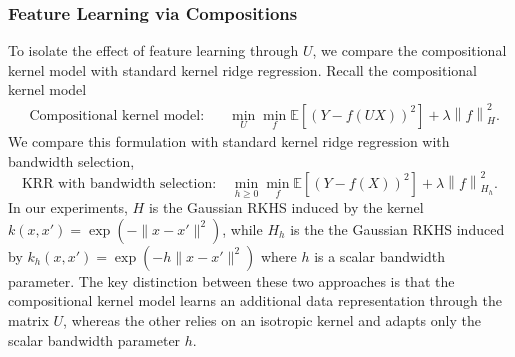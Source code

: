 \documentclass[sn-mathphys-num]{sn-jnl}%
\numberwithin{equation}{section}
\newcommand{\E}{\mathbb{E}}
\newcommand{\norm}[1]{\left\|{#1}\right\|} %
\theoremstyle{thmstyleone}%
\theoremstyle{thmstyletwo}%
\theoremstyle{thmstylethree}%
\begin{document}
\subsubsection{Feature Learning via Compositions}
\indent\indent
To isolate the effect of feature learning through $U$, we compare the compositional kernel model with standard kernel ridge regression.
Recall the compositional kernel model
\begin{equation*}
\begin{split}
      ~~~\text{Compositional kernel model}:~~~~~~~ \min_U \min_f \E[(Y- f(U X))^2] + \lambda \norm{f}_{H}^2.
\end{split}
\end{equation*}
We compare this formulation with standard kernel ridge regression with bandwidth selection,
\begin{equation*}
    \text{KRR with bandwidth selection}:~~~~\min_{h \ge 0} \min_f  \E[(Y- f(X))^2] + \lambda \norm{f}_{H_h}^2.
  \end{equation*}
In our experiments, $H$ is the Gaussian RKHS induced by the kernel $k(x, x') = \exp\!\left(-\|x-x'\|^2\right)$, 
while $H_h$ is the the Gaussian RKHS induced by $k_h(x,x') = \exp\!\left(-h \|x-x'\|^2\right)$ where $h$ is a scalar bandwidth parameter.
The key distinction between these two approaches is that the compositional kernel model learns an additional data representation through the matrix $U$, whereas the other relies on an isotropic kernel and adapts only the scalar bandwidth parameter $h$.
  
\end{document}
